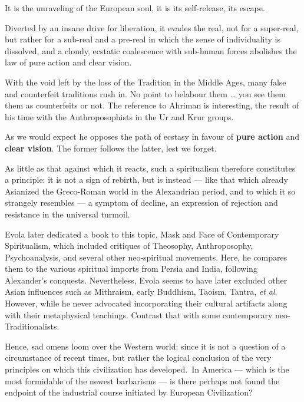 It is the unraveling of the European soul, it is its self-release, its escape. 

Diverted by an insane drive for liberation, it evades the real, not for a super-real, but rather for a sub-real and a pre-real in which the sense of individuality is dissolved, and a cloudy, ecstatic coalescence with sub-human forces abolishes the law of pure action and clear vision. 

\begin{quotex}
With the void left by the loss of the Tradition in the Middle Ages, many false and counterfeit traditions rush in. No point to belabour them … you see them them as counterfeits or not. The reference to Ahriman is interesting, the result of his time with the Anthroposophists in the Ur and Krur groups.

As we would expect he opposes the path of ecstasy in favour of \textbf{pure action} and \textbf{clear vision}. The former follows the latter, lest we forget.

\end{quotex}
As little as that against which it reacts, such a spiritualism therefore constitutes a principle: it is not a sign of rebirth, but is instead — like that which already Asianized the Greco-Roman world in the Alexandrian period, and to which it so strangely resembles — a symptom of decline, an expression of rejection and resistance in the universal turmoil. 

\begin{quotex}
Evola later dedicated a book to this topic, Mask and Face of Contemporary Spiritualism, which included critiques of Theosophy, Anthroposophy, Psychoanalysis, and several other neo-spiritual movements. Here, he compares them to the various spiritual imports from Persia and India, following Alexander's conquests. Nevertheless, Evola seems to have later excluded other Asian influences such as Mithraism, early Buddhism, Taoism, Tantra, \emph{et al}. However, while he never advocated incorporating their cultural artifacts along with their metaphysical teachings. Contrast that with some contemporary neo-Traditionalists. 

\end{quotex}
Hence, sad omens loom over the Western world: since it is not a question of a circumstance of recent times, but rather the logical conclusion of the very principles on which this civilization has developed. In America — which is the most formidable of the newest barbarisms — is there perhaps not found the endpoint of the industrial course initiated by European Civilization? 


